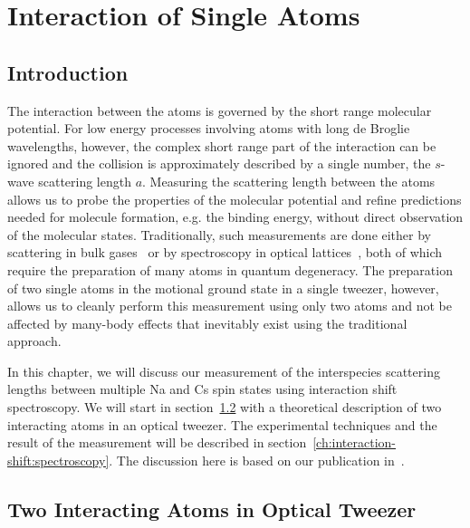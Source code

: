 
\chapter{Interaction of Single Atoms}
\label{ch:interaction-shift}

\section{Introduction}
\label{ch:interaction-shift:introduction}

The interaction between the atoms is governed by the short range molecular potential.
For low energy processes involving atoms with long de Broglie wavelengths, however,
the complex short range part of the interaction
can be ignored and the collision is approximately described by a single number,
the $s$-wave scattering length $a$.
Measuring the scattering length between the atoms allows us to probe the properties
of the molecular potential and refine predictions needed for molecule formation,
e.g. the binding energy, without direct observation of the molecular states.
Traditionally, such measurements are done either by scattering in bulk gases~\cite{
  weiner_experiments_1999} or by spectroscopy in optical lattices~\cite{
  ospelkaus_ultracold_2006,danzl_ultracold_2010,covey_doublon_2016,
  goban_emergence_2018,amato-grill_interaction_2019},
both of which require the preparation of many atoms in quantum degeneracy.
The preparation of two single atoms in the motional ground state in a single tweezer,
however, allows us to cleanly perform this measurement using only two atoms
and not be affected by many-body effects that inevitably exist using the traditional approach.

In this chapter, we will discuss our measurement of the interspecies scattering lengths
between multiple Na and Cs spin states using interaction shift spectroscopy.
We will start in section~\ref{ch:interaction-shift:theory}
with a theoretical description of two interacting atoms in an optical tweezer.
The experimental techniques and the result of the measurement will be described
in section~\ref{ch:interaction-shift:spectroscopy}.
The discussion here is based on our publication in~\cite{hood_multichannel_2020}.

\section{Two Interacting Atoms in Optical Tweezer}
\label{ch:interaction-shift:theory}

